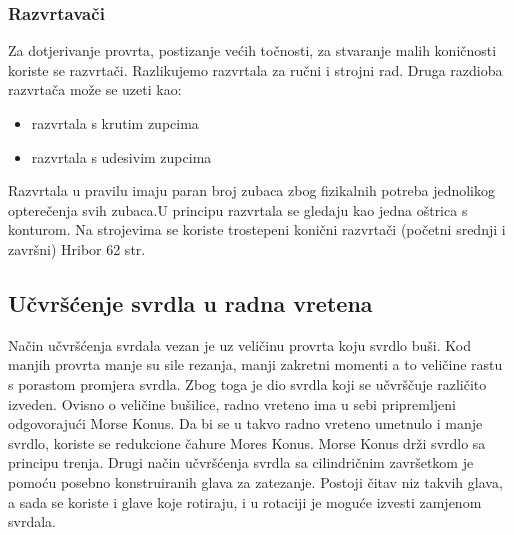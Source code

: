 \documentclass[a4paper,12pt]{article}
\numberwithin{figure}{section}
\begin{document}
\subsubsection{Razvrtavači}
Za dotjerivanje provrta, postizanje većih točnosti, za stvaranje malih koničnosti koriste se razvrtači. Razlikujemo razvrtala za ručni i strojni rad. Druga razdioba razvrtača može se  uzeti kao:
\begin{itemize}
\item razvrtala s krutim zupcima
\item razvrtala s udesivim zupcima
\end{itemize}
Razvrtala u pravilu imaju paran broj zubaca zbog fizikalnih potreba jednolikog opterečenja svih zubaca.U principu razvrtala se gledaju kao jedna oštrica s konturom.
Na strojevima se koriste trostepeni konični razvrtači (početni srednji i završni) Hribor 62 str.
\subsection{Učvršćenje svrdla u radna vretena}
Način učvršćenja svrdala vezan je uz veličinu provrta koju svrdlo buši. Kod manjih provrta manje su sile rezanja, manji zakretni momenti a to veličine rastu s porastom promjera svrdla. Zbog toga je dio svrdla koji se učvrščuje različito izveden.
Ovisno o veličine bušilice, radno vreteno ima u sebi pripremljeni odgovorajući Morse Konus. Da bi se u takvo radno vreteno umetnulo i manje svrdlo, koriste se redukcione čahure Mores Konus. Morse Konus drži svrdlo sa principu trenja. Drugi način učvršćenja svrdla sa cilindričnim završetkom je pomoću posebno konstruiranih glava za zatezanje. Postoji čitav niz takvih glava, a sada se koriste i glave koje rotiraju, i u rotaciji je moguće izvesti zamjenom svrdala.
\end{document}
